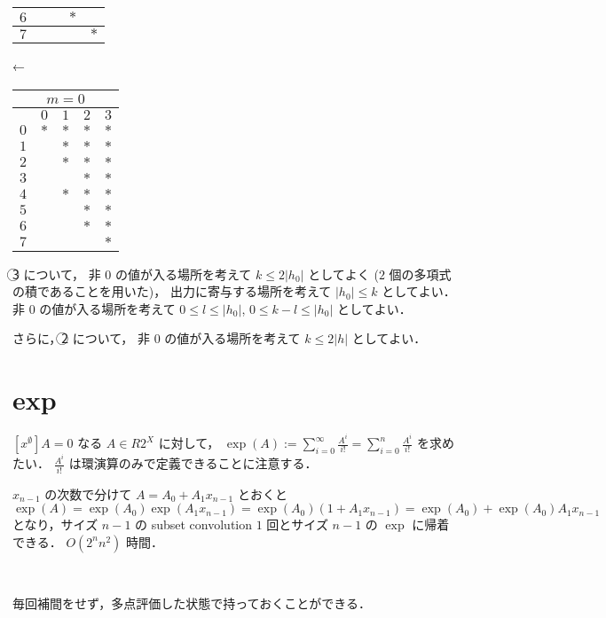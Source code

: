 \documentclass{jsarticle}
\newcommand{\abs}[1]{\lvert #1 \rvert}
\begin{document}
\begin{center}
\begin{tabular}{|l|c|c|c|c|}
    $6$ &     &     & $*$ &     \\\hline
    $7$ &     &     &     & $*$ \\\hline
  \end{tabular}
  ←\
  \begin{tabular}{|l|c|c|c|c|}\hline
    \multicolumn{5}{|c|}{$m=0$} \\\hline
        & $0$ & $1$ & $2$ & $3$ \\\hline
    $0$ & $*$ & $*$ & $*$ & $*$ \\\hline
    $1$ &     & $*$ & $*$ & $*$ \\\hline
    $2$ &     & $*$ & $*$ & $*$ \\\hline
    $3$ &     &     & $*$ & $*$ \\\hline
    $4$ &     & $*$ & $*$ & $*$ \\\hline
    $5$ &     &     & $*$ & $*$ \\\hline
    $6$ &     &     & $*$ & $*$ \\\hline
    $7$ &     &     &     & $*$ \\\hline
  \end{tabular}
\end{center}

\textcircled{3} について，
非 $0$ の値が入る場所を考えて $k \le 2\abs{h_0}$ としてよく
($2$ 個の多項式の積であることを用いた)，
出力に寄与する場所を考えて $\abs{h_0} \le k$ としてよい．
非 $0$ の値が入る場所を考えて $0 \le l \le \abs{h_0}$, $0 \le k-l \le \abs{h_0}$ としてよい．

さらに，\textcircled{2} について，
非 $0$ の値が入る場所を考えて $k \le 2\abs{h}$ としてよい．


\section{exp}
$[x^\emptyset] A = 0$ なる $A \in R 2^X$ に対して，
$\exp(A) := \sum_{i=0}^\infty \frac{A^i}{i!} = \sum_{i=0}^n \frac{A^i}{i!}$ を求めたい．
$\frac{A^i}{i!}$ は環演算のみで定義できることに注意する．

$x_{n-1}$ の次数で分けて
$A = A_0 + A_1 x_{n-1}$ とおくと
\[
  \exp(A)
  = \exp(A_0) \exp(A_1 x_{n-1})
  = \exp(A_0) (1 + A_1 x_{n-1})
  = \exp(A_0) + \exp(A_0) A_1 x_{n-1}
\]
となり，サイズ $n-1$ の subset convolution $1$ 回とサイズ $n-1$ の $\exp$ に帰着できる．
$O(2^n n^2)$ 時間．

\

毎回補間をせず，多点評価した状態で持っておくことができる．
\end{document}
